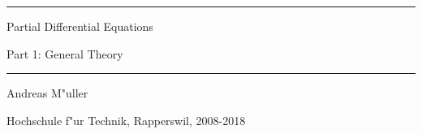 \documentclass[a4paper,12pt]{book}
\begin{document}
\pagestyle{fancy}
\lhead{}
\rhead{}
\frontmatter
\newcommand\HRule{\noindent\rule{\linewidth}{1.5pt}}
\begin{titlepage}
\HRule
\vspace*{10pt}
\begin{flushright}
{\Huge
Partial Differential Equations}
\end{flushright}
\begin{flushright}
{\Large Part 1: General Theory}
\end{flushright}
\HRule
\begin{flushright}
\vspace{30pt}
\LARGE
Andreas M"uller
\end{flushright}
\begin{center}
Hochschule f"ur Technik, Rapperswil, 2008-2018
\end{center}
\end{titlepage}
\hypersetup{
    colorlinks=true,
    linktoc=all,
    linkcolor=blue
}
\tableofcontents
\newtheorem{satz}{Satz}[chapter]
\newtheorem{problem}[satz]{Problem}
\newtheorem{hilfssatz}[satz]{Hilfssatz}
\newtheorem{definition}[satz]{Definition}
\newtheorem{annahme}[satz]{Annahme}
\newtheorem{aufgabe}[satz]{Aufgabe}
\newenvironment{beispiel}[1][Beispiel]{%
\begin{proof}[#1]%
\renewcommand{\qedsymbol}{$\bigcirc$}
}{\end{proof}}
\mainmatter


%
%
%
%
%
%
%
%
%
%
\appendix
%
%

\end{document}
